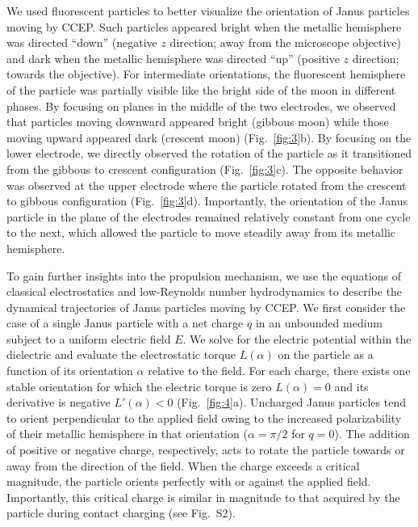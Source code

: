 We used fluorescent particles to better visualize the orientation of Janus particles moving by CCEP.  
Such particles appeared bright when the metallic hemisphere was directed ``down'' (negative $z$ direction; away from the microscope objective) and dark when the metallic hemisphere was directed ``up'' (positive $z$ direction; towards the objective). 
For intermediate orientations, the fluorescent hemisphere of the particle was partially visible like the bright side of the moon in different phases.
By focusing on planes in the middle of the two electrodes, we observed that particles moving downward appeared bright (gibbous moon) while those moving upward appeared dark (crescent moon) (Fig.~\ref{fig:3}b).
By focusing on the lower electrode, we directly observed the rotation of the particle as it transitioned from the gibbous to crescent configuration (Fig.~\ref{fig:3}c).  
The opposite behavior was observed at the upper electrode where the particle rotated from the crescent to gibbous configuration (Fig.~\ref{fig:3}d).
Importantly, the orientation of the Janus particle in the plane of the electrodes remained relatively constant from one cycle to the next, which allowed the particle to move steadily away from its metallic hemisphere.   

To gain further insights into the propulsion mechanism, we use the equations of classical electrostatics and low-Reynolds number hydrodynamics to describe the dynamical trajectories of Janus particles moving by CCEP.
We first consider the case of a single Janus particle with a net charge $q$ in an unbounded medium subject to a uniform electric field $E$.
We solve for the electric potential within the dielectric and evaluate the electrostatic torque $L(\alpha)$ on the particle as a function of its orientation $\alpha$ relative to the field.
For each charge, there exists one stable orientation for which the electric torque is zero $L(\alpha)=0$ and its derivative is negative $L'(\alpha)<0$ (Fig.~\ref{fig:4}a).
Uncharged Janus particles tend to orient perpendicular to the applied field owing to the increased polarizability of their metallic hemisphere in that orientation ($\alpha=\pi/2$ for $q=0$).
The addition of positive or negative charge, respectively, acts to rotate the particle towards or away from the direction of the field.
When the charge exceeds a critical magnitude, the particle orients perfectly with or against the applied field.
Importantly, this critical charge is similar in magnitude to that acquired by the particle during contact charging (see Fig.~S2). 

